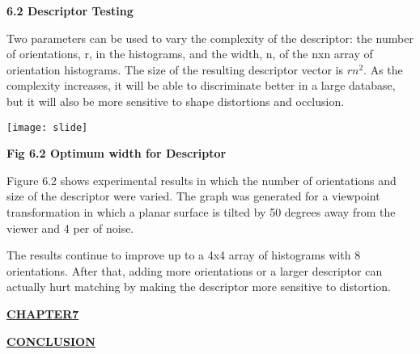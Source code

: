 \documentclass[12pt,a4paper]{report}
\begin{document}
\begin{flushleft}
\newpage



\textbf{6.2  Descriptor Testing}


Two parameters  can be used to vary the complexity of the descriptor: the
number of orientations, r, in the histograms, and the width, n, of the nxn array of orientation
histograms. The size of the resulting descriptor vector is $rn^2$. As the complexity increases, it will be able to discriminate better in a large database, but it will also be
more sensitive to shape distortions and occlusion.\par
\vspace{10 mm}
\begin{center}\texttt{[image: slide]}\end{center}
\begin{center}
\textbf{Fig 6.2 Optimum width for Descriptor}
\end{center}

\vspace{10mm}

Figure 6.2 shows experimental results in which the number of orientations and size of the
descriptor were varied. The graph was generated for a viewpoint transformation in which a
planar surface is tilted by 50 degrees away from the viewer and 4 per of noise.\par
\vspace{10mm}
The results
continue to improve up to a 4x4 array of histograms with 8 orientations. After that, adding
more orientations or a larger descriptor can actually hurt matching by making the descriptor
more sensitive to distortion.







\newpage
\begin{center}\underline{ \Large \textbf{CHAPTER7}}\end{center}
\begin{center}\underline{ \Large \textbf{CONCLUSION}}\end{center}
\vspace{10mm}






\end{flushleft}
\end{document}
